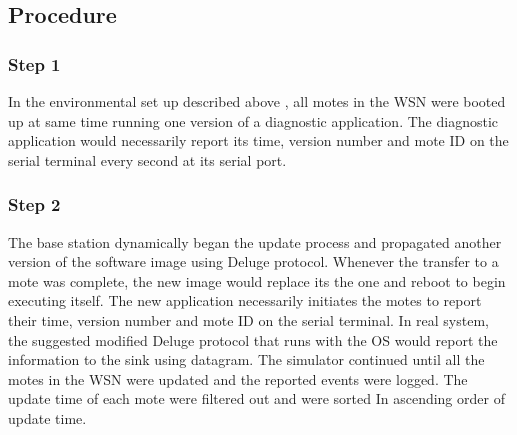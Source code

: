 \documentclass[conference]{IEEEtran}
\newcommand{\notedme}[1]{\raisebox{0pt}[0pt][0pt]{\pdfcomment[open=true,color=blue]{#1}}}
\begin{document}
\subsection*{Procedure}
\label{subsec:proc}
%
%
%
\subsubsection*{Step 1} 
In the environmental set up described above , all motes in the WSN were booted up at same time running one version of a diagnostic application. 
The diagnostic application would necessarily report its time, version number and mote ID on the serial terminal every second at its serial port. 


\subsubsection*{Step 2} 
The base station dynamically began the update process and propagated another version of the software image using Deluge protocol. %
Whenever the transfer to a mote was complete, the new image would replace its the one and reboot to begin executing itself.
The  new application necessarily initiates the motes to report their time, version number and mote ID on the serial terminal. 
In real system, the suggested modified Deluge protocol that runs with the OS would report the information to the sink using datagram.
The simulator continued until all the motes in the WSN were updated and the reported events were logged. 
The update time of each mote were filtered out  and were sorted In ascending order of update time.

\end{document}
